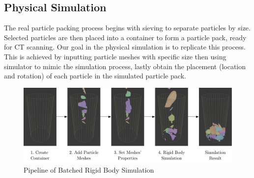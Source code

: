 \documentclass[preprint,12pt]{elsarticle}
\begin{document}
\subsection{Physical Simulation}
The real particle packing process begins with sieving to separate particles by size. 
Selected particles are then placed into a container to form a particle pack, ready for CT scanning.
Our goal in the physical simulation is to replicate this process.
This is achieved by inputting particle meshes with specific size then using simulator to mimic the simulation process, lastly obtain the placement (location and rotation) of each particle in the simulated particle pack.
\begin{figure}[H]
    \includegraphics[width=\textwidth]{figures/pdf/simulation-pipeline.pdf}
    \caption{Pipeline of Batched Rigid Body Simulation}
    \label{fig:batched_rigid_body_simulation_pipeline}
\end{figure}
\par
\end{document}
